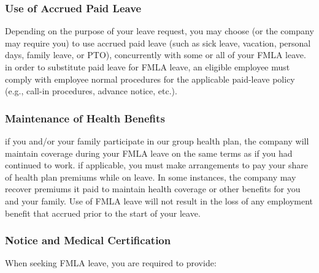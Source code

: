 \subsubsection{Use of Accrued Paid Leave}

Depending on the purpose of your leave request, you may choose (or the company may require you) to use accrued paid leave (such as sick leave, vacation, personal days, family leave, or PTO), concurrently with some or all of your FMLA leave. in order to substitute paid leave for FMLA leave, an eligible employee must comply with employee normal procedures for the applicable paid-leave policy (e.g., call-in procedures, advance notice, etc.).

\subsubsection{Maintenance of Health Benefits}

if you and/or your family participate in our group health plan, the company will maintain coverage during your FMLA leave on the same terms as if you had continued to work. if applicable, you must make arrangements to pay your share of health plan premiums while on leave. In some instances, the company may recover premiums it paid to maintain health coverage or other benefits for you and your family. Use of FMLA leave will not result in the loss of any employment benefit that accrued prior to the start of your leave.

\subsubsection{Notice and Medical Certification}

When seeking FMLA leave, you are required to provide:

